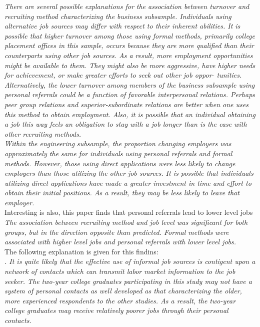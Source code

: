 \documentclass[a4paper, 11pt]{article} %
\begin{document}
\emph{There are several possible explanations for the association 
between turnover and recruiting method characterizing the 
business subsample. Individuals using alternative job sources may 
differ with respect to their inherent abilities. It is possible that 
higher turnover among those using formal methods, primarily 
college placement offices in this sample, occurs because they are 
more qualified than their counterparts using other job sources. 
As a result, more employment opportunities might be available 
to them. They might also be more aggressive, have higher needs for 
achievement, or make greater efforts to seek out other job oppor- 
tunities. Alternatively, the lower turnover among members of the 
business subsample using personal referrals could be a function 
of favorable interpersonal relations. Perhaps peer group relations 
and superior-subordinate relations are better when one uses this 
method to obtain employment. Also, it is possible that an 
individual obtaining a job this way feels an obligation to stay with 
a job longer than is the case with other recruiting methods.}\\ 

\emph{Within the engineering subsample, the proportion changing 
employers was approximately the same for individuals using 
personal referrals and formal methods. However, those using direct 
applications were less likely to change employers than those 
utilizing the other job sources. It is possible that individuals 
utilizing direct applications have made a greater investment in 
time and effort to obtain their initial positions. As a result, they 
may be less likely to leave that employer.}\\

Interesting is also, this paper finds that personal referrals lead to lower level jobs\\

\emph{The association between recruiting method and job level 
was significant for both groups, but in the direction opposite 
than predicted. Formal methods were associated with higher level 
jobs and personal referrals with lower level jobs.}\\

The following explanation is given for this findins:\\

\emph{. It is quite likely that the effective use of 
informal job sources is contigent upon a network of contacts 
which can transmit labor market information to the job seeker. 
The two-year college graduates participating in this study may 
not have a system of personal contacts as well developed as 
that characterizing the older, more experienced respondents 
to the other studies. As a result, the two-year college graduates 
may receive relatively poorer jobs through their personal contacts.}\\
\end{document}
